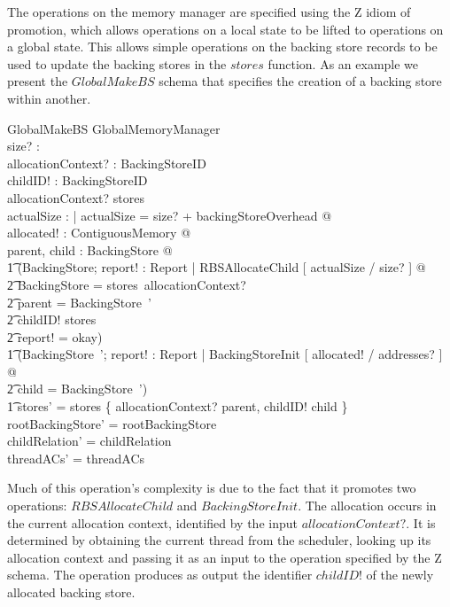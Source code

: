 \documentclass[a4paper,10pt]{report}
\begin{document}
The operations on the memory manager are specified using the Z idiom
of promotion, which allows operations on a local state to be lifted to
operations on a global state.
This allows simple operations on the backing store records to be used
to update the backing stores in the $stores$ function.
As an example we present the $GlobalMakeBS$ schema that specifies the
creation of a backing store within another.
%
\begin{schema}{GlobalMakeBS}
  \Delta GlobalMemoryManager \\
  size?
  : \nat \\
  allocationContext?
  : BackingStoreID \\
  childID!
  : BackingStoreID \\
  \where allocationContext?
  \in \dom stores \\
  \exists actualSize : \nat | actualSize = size?
  + backingStoreOverhead @ \\
  \exists allocated!
  : ContiguousMemory @ \\
  \exists parent, child : BackingStore @ \\
  \t1 (\exists \Delta BackingStore; report!
  : Report | RBSAllocateChild [ actualSize / size?
  ] @ \\
  \t2 \theta BackingStore = stores~allocationContext?
  \land \\
  \t2 parent = \theta BackingStore~' \land \\
  \t2 childID!
  \notin \dom stores \land \\
  \t2 report!
  = okay) \land \\
  \t1 (\exists BackingStore~'; report!
  : Report | BackingStoreInit [ allocated!
  / addresses?
  ] @ \\
  \t2 child = \theta BackingStore~') \land \\
  \t1 stores' = stores \oplus \{ allocationContext?
  \mapsto parent, childID!
  \mapsto child \} \\
  rootBackingStore' = rootBackingStore \\
  childRelation' = childRelation \\
  threadACs' = threadACs \\
\end{schema}
%
Much of this operation's complexity is due to the fact that it
promotes two operations: $RBSAllocateChild$ and $BackingStoreInit$.
The allocation occurs in the current allocation context, identified by
the input $allocationContext?$.
It is determined by obtaining the current thread from the scheduler,
looking up its allocation context and passing it as an input to the
operation specified by the Z schema.
The operation produces as output the identifier $childID!$ of the
newly allocated backing store.
\end{document}
